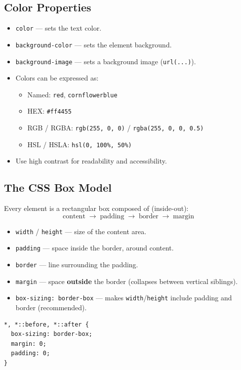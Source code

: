 \documentclass[hidelinks]{article}
\begin{document}
\subsection{Color Properties}
\begin{itemize}
  \item \texttt{color} --- sets the text color.
  \item \texttt{background-color} --- sets the element background.
  \item \texttt{background-image} --- sets a background image (\texttt{url(...)}).
  \item Colors can be expressed as:
    \begin{itemize}
      \item Named: \texttt{red}, \texttt{cornflowerblue}
      \item HEX: \texttt{\#ff4455}
      \item RGB / RGBA: \texttt{rgb(255, 0, 0)} / \texttt{rgba(255, 0, 0, 0.5)}
      \item HSL / HSLA: \texttt{hsl(0, 100\%, 50\%)}
    \end{itemize}
  \item Use high contrast for readability and accessibility.
\end{itemize}

\subsection{The CSS Box Model}
Every element is a rectangular box composed of (inside-out):
\[
  \text{content} \;\to\; \text{padding} \;\to\; \text{border} \;\to\; \text{margin}
\]
\begin{itemize}
  \item \texttt{width} / \texttt{height} --- size of the content area.
  \item \texttt{padding} --- space inside the border, around content.
  \item \texttt{border} --- line surrounding the padding.
  \item \texttt{margin} --- space \textbf{outside} the border (collapses between vertical siblings).
  \item \texttt{box-sizing: border-box} --- makes \texttt{width}/\texttt{height} include padding and border (recommended).
\end{itemize}

\begin{lstlisting}[language={}, caption={Box model reset (best practice)}]
*, *::before, *::after {
  box-sizing: border-box;
  margin: 0;
  padding: 0;
}
\end{lstlisting}
\end{document}
